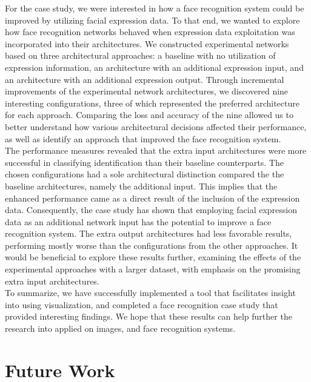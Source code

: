 \noindent For the case study, we were interested in how a face recognition system could be improved by utilizing facial expression data. To that end, we wanted to explore how face recognition networks behaved when expression data exploitation was incorporated into their architectures. We constructed experimental networks based on three architectural approaches: a baseline with no utilization of expression information, an architecture with an additional expression input, and an architecture with an additional expression output. Through incremental improvements of the experimental network architectures, we discovered nine interesting configurations, three of which represented the preferred architecture for each approach. Comparing the loss and accuracy of the nine allowed us to better understand how various architectural decisions affected their performance, as well as identify an approach that improved the face recognition system. \\

\noindent The performance measures revealed that the extra input architectures were more successful in classifying identification than their baseline counterparts. The chosen configurations had a sole architectural distinction compared the the baseline architectures, namely the additional input. This implies that the enhanced performance came as a direct result of the inclusion of the expression data. Consequently, the case study has shown that employing facial expression data as an additional network input has the potential to improve a face recognition system. The extra output architectures had less favorable results, performing mostly worse than the configurations from the other approaches. It would be beneficial to explore these results further, examining the effects of the experimental approaches with a larger dataset, with emphasis on the promising extra input architectures. \\

\noindent To summarize, we have successfully implemented a tool that facilitates insight into  using visualization, and completed a face recognition case study that provided interesting findings. We hope that these results can help further the research into  applied on images, and face recognition systems.

\section{Future Work}

